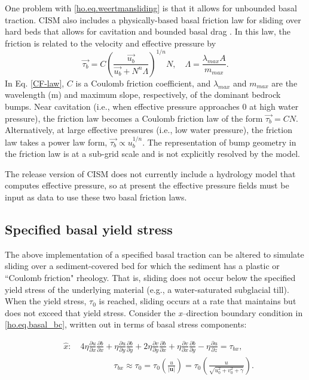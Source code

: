 One problem with \eqref{ho.eq.weertmansliding} is that it allows for unbounded basal traction.
CISM also includes a physically-based basal friction law for sliding over 
hard beds that allows for cavitation and bounded basal drag \citep[]{Schoof2005}.
In this law, the friction is related to the velocity and effective pressure by 
\begin{equation}
    \label{CF-law}
	  \vec{\tau_b} = C \left( \frac{ \vec{u_b} } { \vec{u_b} + N^n \Lambda} \right)^{1/n} N, \quad \Lambda=\frac{\lambda_{max}A}{m_{max}}.
\end{equation}
In Eq. \ref{CF-law}, $C$ is a Coulomb friction coefficient,  and $\lambda_{max}$ and 
$m_{max}$ are the wavelength (m) and maximum slope, respectively, of the 
dominant bedrock bumps.  Near cavitation (i.e., when effective pressure approaches 
0 at high water pressure), the friction law becomes a Coulomb friction law of the 
form $\vec{\tau_b}=CN$. Alternatively, at large effective pressures (i.e., low water pressure), 
the friction law takes a power law form, $\vec{\tau_b} \propto u_b^{1/n}$. 
The representation of bump geometry in the friction law is at a sub-grid scale 
and is not explicitly resolved by the model.

The release version of CISM does not currently include a hydrology model
that computes effective pressure, so at present the effective pressure fields must be
input as data to use these two basal friction laws.

\subsection{Specified basal yield stress}
The above implementation of a specified basal traction can be altered to simulate sliding over a sediment-covered bed for which the sediment has a plastic or ``Coulomb friction" rheology. That is, sliding does not occur below the specified yield stress of the underlying material (e.g., a water-saturated subglacial till). When the yield stress, $\tau_0$ is reached, sliding occurs at a rate that maintains but does not exceed that yield stress. Consider the \textit{x}--direction boundary condition in \eqref{ho.eq.basal_bc}, written out in terms of basal stress components:

\begin{equation}
\begin{split}
  & \hat{x}:\quad 4\eta \frac{\partial u}{\partial x}\frac{\partial b}{\partial x}+\eta \frac{\partial u}{\partial y}\frac{\partial b}{\partial y}+2\eta \frac{\partial v}{\partial y}\frac{\partial b}{\partial x}+\eta \frac{\partial v}{\partial x}\frac{\partial b}{\partial y}-\eta \frac{\partial u}{\partial z}=\tau _{bx}, \\ 
 & \quad \quad \quad \quad \quad \quad \tau _{bx}\approx \tau _{0}=\tau _{0}\left( \frac{u}{\left| \mathbf{u} \right|} \right)=\tau _{0}\left( \frac{u}{\sqrt{u_{0}^{2}+v_{0}^{2}+\gamma }} \right). \\ 
\end{split}
\end{equation}

